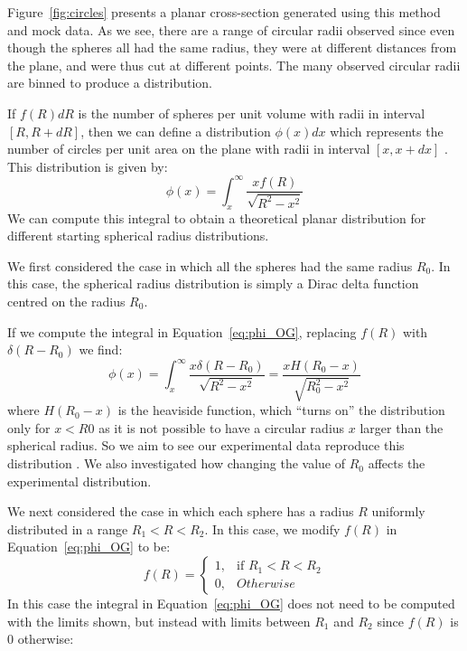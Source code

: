 \documentclass[journal]{IEEEtran}
\begin{document}
Figure~\ref{fig:circles} presents a planar cross-section generated using this
method and mock data. As we see, there are a range of circular radii observed
since even though the spheres all had the same radius, they were at different
distances from the plane, and were thus cut at different points. The many
observed circular radii are binned to produce a distribution.

If $f(R)dR$ is the number of spheres per unit volume with radii in interval $[R,
R + dR]$, then we can define a distribution $\phi(x)dx$ which represents the
number of circles per unit area on the plane with radii in interval $[x,
x+dx]$ . This distribution is given by:
\begin{equation}
\phi(x) = \int_{x}^{\infty}\frac{xf(R)}{\sqrt{R^2 - x^2}}
\label{eq:phi_OG}
\end{equation}
We can compute this integral to obtain a theoretical planar distribution for
different starting spherical radius distributions.

We first considered the case in which all the spheres had the same radius
$R_0$. In this case, the spherical radius distribution is simply a Dirac delta
function centred on the radius $R_0$.

If we compute the integral in Equation~\ref{eq:phi_OG}, replacing $f(R)$ with
$\delta(R-R_0)$ we find:
\begin{equation}
\phi(x) = \int_{x}^{\infty}\frac{x\delta(R-R_0)}{\sqrt{R^2 - x^2}} =
\frac{xH(R_0-x)}{\sqrt{R_0^2-x^2}}
\label{eq:phi_constant}
\end{equation}
where $H(R_0 - x)$ is the heaviside function, which ``turns on'' the
distribution only for $x < R0$ as it is not possible to have a circular radius
$x$ larger than the spherical radius. So we aim to see our experimental data
reproduce this distribution . We also investigated how changing the
value of $R_0$ affects the experimental distribution.

We next considered the case in which each sphere has a radius $R$ uniformly
distributed in a range $R_1 < R < R_2$. In this case, we modify $f(R)$ in
Equation~\ref{eq:phi_OG} to be:
\begin{equation*}
  f(R) =
  \begin{cases}
    1,& \text{if } R_1 < R < R_2\\
    0,& \text{} Otherwise
  \end{cases}
\end{equation*}
In this case the integral in Equation~\ref{eq:phi_OG} does not need to be
computed with the limits shown, but instead with limits between $R_1$ and $R_2$
since $f(R)$ is 0 otherwise:
\end{document}
